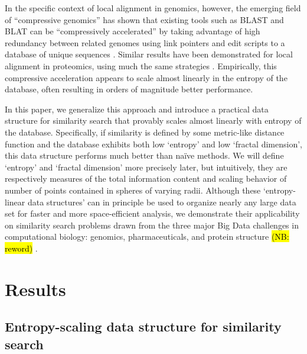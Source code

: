 \documentclass{amsbook}
\theoremstyle{definition}
\theoremstyle{remark}
\numberwithin{equation}{section}
\begin{document}
In the specific context of local alignment in genomics, however, the emerging field of ``compressive genomics'' has shown that existing tools such as BLAST and BLAT can be ``compressively accelerated'' by taking advantage of high redundancy between related genomes using link pointers and edit scripts to a database of unique sequences \cite{loh2012compressive}.
Similar results have been demonstrated for local alignment in proteomics, using much the same strategies \cite{daniels2013compressive}.
Empirically, this compressive acceleration appears to scale almost linearly in the entropy of the database, often resulting in orders of magnitude better performance.

In this paper, we generalize this approach and introduce a practical data structure for similarity search that provably scales almost linearly with entropy of the database.
Specifically, if similarity is defined by some metric-like distance function and the database exhibits both low `entropy' and low `fractal dimension', this data structure performs much better than na\"ive methods.
We will define `entropy' and `fractal dimension' more precisely later, but intuitively, they are respectively measures of the total information content and scaling behavior of number of points contained in spheres of varying radii.
Although these `entropy-linear data structures' can in principle be used to organize nearly any large data set for faster and more space-efficient analysis,
we demonstrate their applicability on similarity search problems drawn from the three major Big Data challenges in computational biology: genomics, pharmaceuticals, and protein structure \hl{(NB: reword)} \cite{marx2013biology}.

\chapter{Results}
\section{Entropy-scaling data structure for similarity search}
\end{document}
